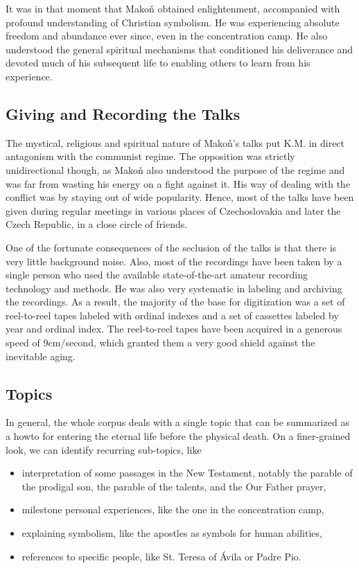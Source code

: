 \documentclass[a4paper,11pt]{article}
\begin{document}
It was in that moment that Mako\v{n} obtained enlightenment, accompanied with
profound understanding of Christian symbolism. He was experiencing absolute
freedom and abundance ever since, even in the concentration camp. He also
understood the general spiritual mechanisms that conditioned his deliverance and
devoted much of his subsequent life to enabling others to learn from his
experience.

\subsection{Giving and Recording the Talks}

The mystical, religious and spiritual nature of Mako\v{n}'s talks put K.M. in
direct antagonism with the communist regime. The opposition was strictly
unidirectional though, as Mako\v{n} also understood the purpose of the regime
and was far from wasting his energy on a fight against it. His way of dealing
with the conflict was by staying out of wide popularity. Hence, most of the
talks have been given during regular meetings in various places of
Czechoslovakia and later the Czech Republic, in a close circle of friends.

One of the fortunate consequences of the seclusion of the talks is that there is
very little background noise. Also, most of the recordings
have been taken by a single person who used the available state-of-the-art
amateur recording technology and methods. He was also very systematic in
labeling and archiving the recordings. As a result, the majority of the base for
digitization was a set of reel-to-reel tapes labeled with ordinal indexes and a
set of cassettes labeled by year and ordinal index. The reel-to-reel tapes have
been acquired in a generous speed of 9cm/second, which granted them a very good
shield against the inevitable aging.

\subsection{Topics}

In general, the whole corpus deals with a single topic that can be summarized as
a howto for entering the eternal life before the physical death. On a
finer-grained look, we can identify recurring sub-topics, like

\begin{itemize}
\item{interpretation of some passages in the New Testament, notably the parable
of the prodigal son, the parable of the talents, and the Our Father prayer,}
\item{milestone personal experiences, like the one in the concentration camp,}
\item{explaining symbolism, like the apostles as symbols for human abilities,}
\item{references to specific people, like St. Teresa of \'{A}vila or Padre Pio.}
\end{itemize}
\end{document}
